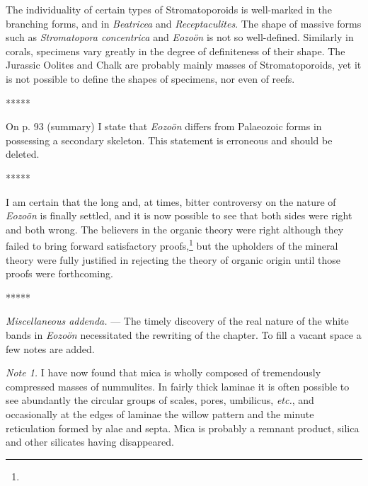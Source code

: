\documentclass[a4paper, 12pt, oneside]{article}
\begin{document}
The individuality of certain types of Stromatoporoids is well-marked in the branching forms, and in \emph{Beatricea} and \emph{Receptaculites}. The shape of massive forms such as \emph{Stromatopora concentrica} and \emph{Eozoön} is not so well-defined. Similarly in corals, specimens vary greatly in the degree of definiteness of their shape. The Jurassic Oolites and Chalk are probably mainly masses of Stromatoporoids, yet it is not possible to define the shapes of specimens, nor even of reefs.

\centerline{*\hspace{15mm}*\hspace{15mm}*\hspace{15mm}*\hspace{15mm}*}
\bigskip

On p. 93 (summary) I state that \emph{Eozoön} differs from Palaeozoic forms in possessing a secondary skeleton. This statement is erroneous and should be deleted.

\centerline{*\hspace{15mm}*\hspace{15mm}*\hspace{15mm}*\hspace{15mm}*}
\bigskip

I am certain that the long and, at times, bitter controversy on the nature of \emph{Eozoön} is finally settled, and it is now possible to see that both sides were right and both wrong. The believers in the organic theory were right although they failed to bring forward satisfactory proofs,\footnote{} but the upholders of the mineral theory were fully justified in rejecting the theory of organic origin until those proofs were forthcoming.

\centerline{*\hspace{15mm}*\hspace{15mm}*\hspace{15mm}*\hspace{15mm}*}
\bigskip

\small
\emph{Miscellaneous addenda.} --- The timely discovery of the real nature of the white bands in \emph{Eozoön} necessitated the rewriting of the chapter. To fill a vacant space a few notes are added.

\emph{Note 1.} I have now found that mica is wholly composed of tremendously compressed masses of nummulites. In fairly thick laminae it is often possible to see abundantly the circular groups of scales, pores, umbilicus, \emph{etc.}, and occasionally at the edges of laminae the willow pattern and the minute reticulation formed by alae and septa. Mica is probably a remnant product, silica and other silicates having disappeared.
\end{document}
